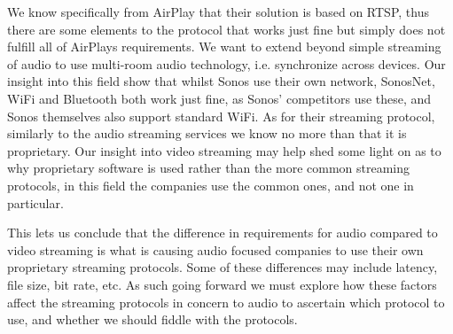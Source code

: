 We know specifically from AirPlay that their solution is based on \ac{RTSP}, thus there are some elements to the protocol that works just fine but simply does not fulfill all of AirPlays requirements.
We want to extend beyond simple streaming of audio to use multi-room audio technology, i.e. synchronize across devices. 
Our insight into this field show that whilst Sonos use their own network, SonosNet, WiFi and Bluetooth both work just fine, as Sonos' competitors use these, and Sonos themselves also support standard WiFi.
As for their streaming protocol, similarly to the audio streaming services we know no more than that it is proprietary.
Our insight into video streaming may help shed some light on as to why proprietary software is used rather than the more common streaming protocols, in this field the companies use the common ones, and not one in particular.

This lets us conclude that the difference in requirements for audio compared to video streaming is what is causing audio focused companies to use their own proprietary streaming protocols.
Some of these differences may include latency, file size, bit rate, etc.
As such going forward we must explore how these factors affect the streaming protocols in concern to audio to ascertain which protocol to use, and whether we should fiddle with the protocols.










